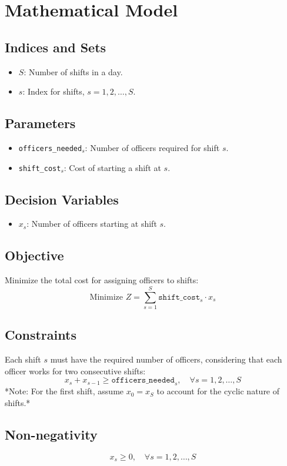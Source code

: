\documentclass{article}
\begin{document}
\section*{Mathematical Model}

\subsection*{Indices and Sets}
\begin{itemize}
    \item \( S \): Number of shifts in a day.
    \item \( s \): Index for shifts, \( s = 1, 2, \ldots, S \).
\end{itemize}

\subsection*{Parameters}
\begin{itemize}
    \item \texttt{officers\_needed}$_s$: Number of officers required for shift \( s \).
    \item \texttt{shift\_cost}$_s$: Cost of starting a shift at \( s \).
\end{itemize}

\subsection*{Decision Variables}
\begin{itemize}
    \item \( x_s \): Number of officers starting at shift \( s \).
\end{itemize}

\subsection*{Objective}
Minimize the total cost for assigning officers to shifts:
\[
\text{Minimize } Z = \sum_{s=1}^{S} \texttt{shift\_cost}_s \cdot x_s
\]

\subsection*{Constraints}
Each shift \( s \) must have the required number of officers, considering that each officer works for two consecutive shifts:
\[
x_s + x_{s-1} \geq \texttt{officers\_needed}_s, \quad \forall s = 1, 2, \ldots, S
\]
*Note: For the first shift, assume \( x_0 = x_S \) to account for the cyclic nature of shifts.*

\subsection*{Non-negativity}
\[
x_s \geq 0, \quad \forall s = 1, 2, \ldots, S
\]
\end{document}
